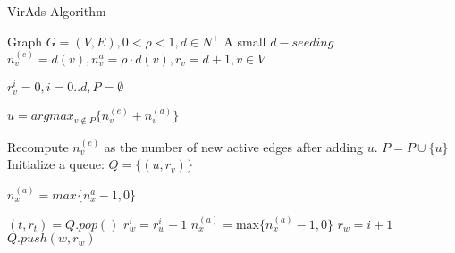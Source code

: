 \begin{algorithm}
	\caption{VirAds Algorithm}
	\begin{algorithmic}[1]
		
		
		\Require Graph $G = (V,E),0<\rho<1,d\in N^{+}$
		\Ensure A small $d-seeding$ 
		\State $n_{v}^{(e)} = d(v),n_{v}^{a} = \rho \cdot d(v), r_{v}  = d + 1, v \in V $
		
		\State $r_{v}^{i}=0, i=0..d, P  = \emptyset $
		
		
		\Repeat
		\State $u  = argmax_{v\not\in P}\{n_{v}^{(e)}+n_{v}^{(a)}\}$ 
		
		Recompute $n_{v}^{(e)}$ as the number of new active edges after adding $u$.
		\State $P  = P \cup \{u\} $
		\State Initialize a queue: $Q  = \{(u,r_{v})\} $
		
		\State $n_{x}^{(a)}  = max\{n_{x}^{a}-1,0\} $
		
		\EndFor
		\State$(t,r_{t})  = Q.pop() $
		\State $r_{w}^{i}=r_{w}^{i}+1 $
		\State $n_{x}^{(a)} =$max$\{n_{x}^{(a)}-1,0\} $	
		\EndFor
		\State $r_{w}=i+1 $
		\State $Q.push(w,r_{w}) $	
		\EndIf
		\EndIf
		\EndFor
		\EndFor
		\EndWhile
		\EndWhile
	\end{algorithmic}
\end{algorithm}
